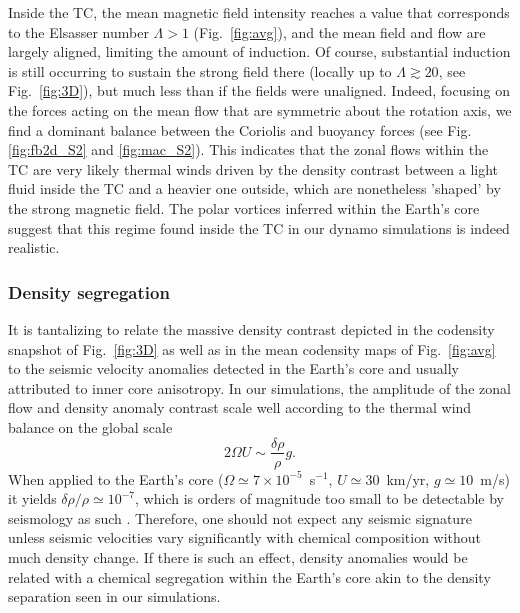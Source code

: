 \documentclass[12pt, a4paper]{article}
\begin{document}
Inside the TC, the mean magnetic field intensity reaches a value that corresponds to the Elsasser number $\Lambda > 1$ (Fig.~\ref{fig:avg}), and the mean field and flow are largely aligned, limiting the amount of induction.
Of course, substantial induction is still occurring to sustain the strong field there (locally up to $\Lambda \gtrsim 20$, see Fig.~\ref{fig:3D}), but much less than if the fields were unaligned.
Indeed, focusing on the forces acting on the mean flow that are symmetric about the rotation axis, we find a dominant balance between the Coriolis and buoyancy forces (see Fig. \ref{fig:fb2d_S2} and \ref{fig:mac_S2}).
This indicates that the zonal flows within the TC are very likely thermal winds driven by the density contrast between a light fluid inside the TC and a heavier one outside, which are nonetheless 'shaped' by the strong magnetic field.
The polar vortices inferred within the Earth's core \citep{olson1999} suggest that this regime found inside the TC in our dynamo simulations is indeed realistic.

\subsubsection{Density segregation}

It is tantalizing to relate the massive density contrast depicted in the codensity snapshot of Fig.~\ref{fig:3D} as well as in the mean codensity maps of Fig.~\ref{fig:avg} to the seismic velocity anomalies detected in the Earth's core \citep[e.g.][]{souriau1990} and usually attributed to inner core anisotropy.
In our simulations, the amplitude of the zonal flow and density anomaly contrast scale well according to the thermal wind balance on the global scale
\begin{equation}
2\Omega U \sim \frac{\delta\rho}{\rho} g.  \label{eq:thwind}
\end{equation}
When applied to the Earth's core ($\Omega \simeq 7 \times 10^{-5}$~s$^{-1}$, $U \simeq 30$~km/yr, $g \simeq 10$~m/s) it yields $\delta\rho/\rho \simeq 10^{-7}$, which is orders of magnitude too small to be detectable by seismology as such \citep[see also][]{stevenson1987,aurnou2003}.
Therefore, one should not expect any seismic signature unless seismic velocities vary significantly with chemical composition without much density change.
If there is such an effect, density anomalies  would be related with a chemical segregation within the Earth's core akin to the density separation seen in our simulations.
\end{document}
